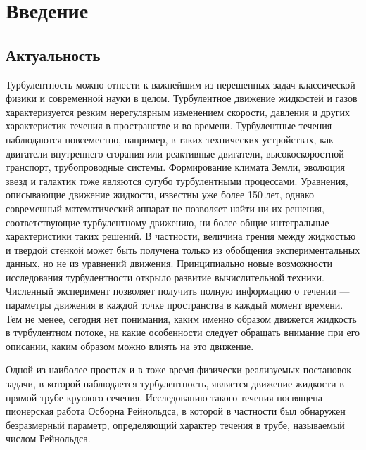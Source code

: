 \chapter{Введение}

\section{Актуальность}




Турбулентность можно отнести к важнейшим из нерешенных задач классической физики и современной науки в целом. Турбулентное движение жидкостей и газов характеризуется резким нерегулярным изменением скорости, давления и других характеристик течения в пространстве и во времени. Турбулентные течения наблюдаются повсеместно, например, в таких технических устройствах, как двигатели внутреннего сгорания или реактивные двигатели, высокоскоростной транспорт, трубопроводные системы. Формирование климата Земли, эволюция звезд и галактик тоже являются сугубо турбулентными процессами. Уравнения, описывающие движение жидкости, известны уже более 150 лет, однако современный математический аппарат не позволяет найти ни их решения, соответствующие турбулентному движению, ни более общие интегральные характеристики таких решений. В частности, величина трения между жидкостью и твердой стенкой может быть получена только из обобщения экспериментальных данных, но не из уравнений движения. Принципиально новые возможности исследования турбулентности открыло развитие вычислительной техники. Численный эксперимент позволяет получить полную информацию о течении --- параметры движения в каждой точке пространства в каждый момент времени. Тем не менее, сегодня нет понимания, каким именно образом движется жидкость в турбулентном потоке, на какие особенности следует обращать внимание при его описании, каким образом можно влиять на это движение. 


Одной из наиболее простых и в тоже время физически реализуемых постановок задачи, в которой наблюдается турбулентность, является движение жидкости в прямой трубе круглого сечения. Исследованию такого течения посвящена пионерская работа Осборна Рейнольдса, в которой в частности был обнаружен безразмерный параметр, определяющий характер течения в трубе, называемый числом Рейнольдса. 

